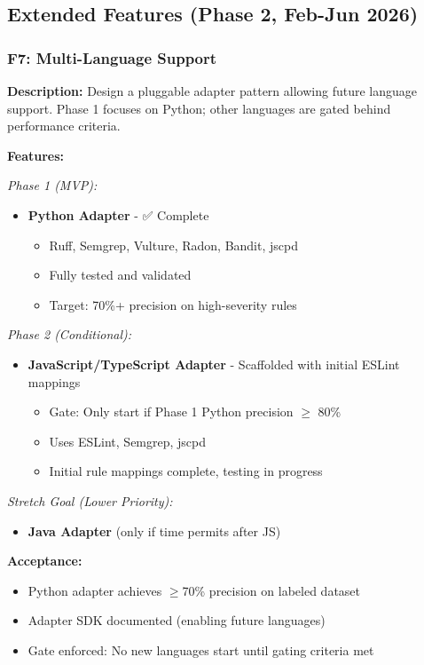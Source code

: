 \documentclass[11pt,a4paper]{article}
\begin{document}
\subsection{Extended Features (Phase 2, Feb-Jun 2026)}

\subsubsection{F7: Multi-Language Support}
\textbf{Description:} Design a pluggable adapter pattern allowing future language support. Phase 1 focuses on Python; other languages are gated behind performance criteria.

\textbf{Features:}

\textit{Phase 1 (MVP):}
\begin{itemize}[leftmargin=*]
    \item \textbf{Python Adapter} - ✅ Complete
    \begin{itemize}
        \item Ruff, Semgrep, Vulture, Radon, Bandit, jscpd
        \item Fully tested and validated
        \item Target: 70\%+ precision on high-severity rules
    \end{itemize}
\end{itemize}

\textit{Phase 2 (Conditional):}
\begin{itemize}[leftmargin=*]
    \item \textbf{JavaScript/TypeScript Adapter} - Scaffolded with initial ESLint mappings
    \begin{itemize}
        \item Gate: Only start if Phase 1 Python precision $\geq$ 80\%
        \item Uses ESLint, Semgrep, jscpd
        \item Initial rule mappings complete, testing in progress
    \end{itemize}
\end{itemize}

\textit{Stretch Goal (Lower Priority):}
\begin{itemize}[leftmargin=*]
    \item \textbf{Java Adapter} (only if time permits after JS)
\end{itemize}

\textbf{Acceptance:}
\begin{itemize}[leftmargin=*]
    \item[$\checkmark$] Python adapter achieves $\geq$70\% precision on labeled dataset
    \item[$\checkmark$] Adapter SDK documented (enabling future languages)
    \item[$\checkmark$] Gate enforced: No new languages start until gating criteria met
\end{itemize}
\end{document}
